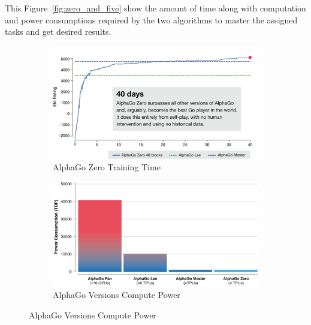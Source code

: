 This Figure~\ref{fig:zero_and_five} show the amount of time along with computation and power consumptions required by the two algorithms to master the assigned tasks and get desired results. 

\begin{figure}[!htb]
	\centering
	\begin{subfigure}[b]{0.4\textwidth}
		\centering
		\includegraphics[width=1.1\textwidth]{figures/rl/alphago_zero.png}
		\caption{AlphaGo Zero Training Time}
		\label{fig:alphago_train}
	\end{subfigure}
	\hfill
	\begin{subfigure}[b]{0.4\textwidth}
		\centering
		\includegraphics[width=1.1\textwidth]{figures/rl/alphago_power.png}
		\caption{AlphaGo Versions Compute Power}
		\label{fig:alphago_power}
	\end{subfigure}
	\hfill
	

\end{figure}
